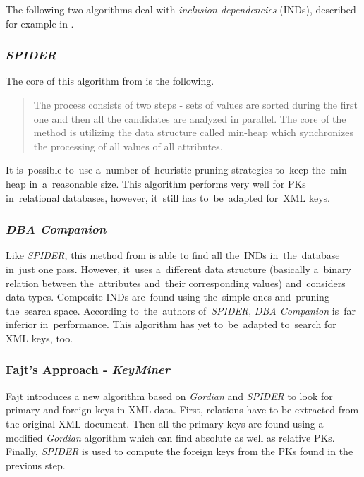 The following two algorithms deal with \textit{inclusion dependencies} (INDs), described for example in \cite{fajt-12}.

\subsubsection{\textit{SPIDER}}

The core of this algorithm from \cite{fajt-51, fajt-53} is the following.

\begin{quote}
The process consists of two steps - sets of values are sorted during the first one and then all the candidates are analyzed in parallel. The core of the method is utilizing the data structure called min-heap which synchronizes the processing of all values of all attributes.
\end{quote}

It is~possible to~use a~number of~heuristic pruning strategies to~keep the~min-heap in~a~reasonable size. This algorithm performs very well for PKs in~relational databases, however, it~still has to~be~adapted for~XML keys.

\subsubsection{\textit{DBA Companion}}

Like \textit{SPIDER}, this method from \cite{fajt-53} is able to find all the~INDs in~the~da\-ta\-base in~just one pass. However, it~uses a~different data structure (basically a~binary relation between the~attributes and~their corresponding values) and~considers data types. Composite INDs are~found using the~simple ones and~pruning the~search space. According to~the~authors of~\textit{SPIDER}, \textit{DBA Companion} is~far inferior in~performance. This algorithm has yet to~be~adapted to~search for XML keys, too.

\subsubsection{Fajt's Approach - \textit{KeyMiner}}

Fajt introduces a new algorithm based on \textit{Gordian} and \textit{SPIDER} to look for primary and foreign keys in XML data. First, relations have to be extracted from the original XML document. Then all the primary keys are found using a modified \textit{Gordian} algorithm which can find absolute as well as relative PKs. Finally, \textit{SPIDER} is used to compute the foreign keys from the PKs found in the previous step.

